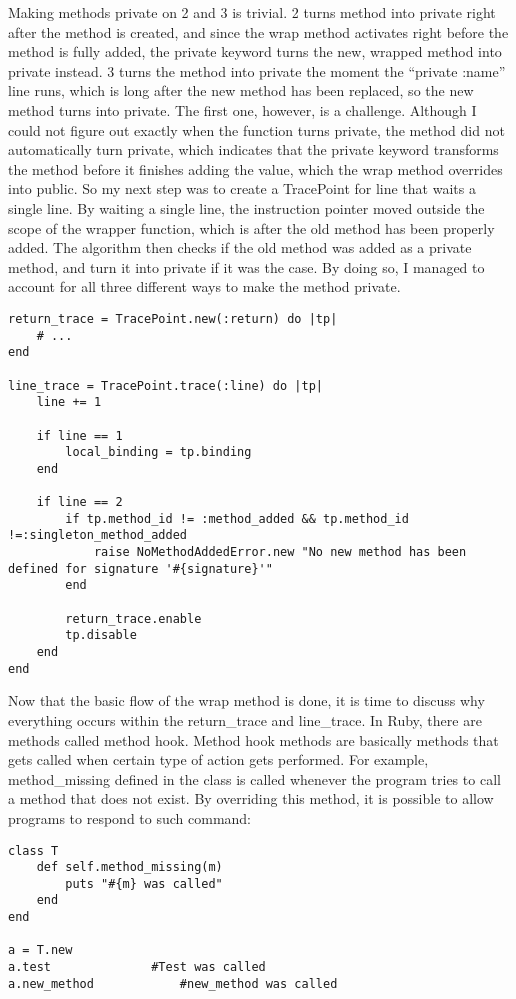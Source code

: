 Making methods private on 2 and 3 is trivial.  2 turns method into private right after the method is created, and since the wrap method activates right before the method is fully added, the private keyword turns the new, wrapped method into private instead.  3 turns the method into private the moment the ``private :name'' line runs, which is long after the new method has been replaced, so the new method turns into private.  The first one, however, is a challenge.  Although I could not figure out exactly when the function turns private, the method did not automatically turn private, which indicates that the private keyword transforms the method before it finishes adding the value, which the wrap method overrides into public.  So my next step was to create a TracePoint for line that waits a single line.  By waiting a single line, the instruction pointer moved outside the scope of the wrapper function, which is after the old method has been properly added.  The algorithm then checks if the old method was added as a private method, and turn it into private if it was the case.  By doing so, I managed to account for all three different ways to make the method private.

\begin{lstlisting}[caption={The other TracePoints}]
return_trace = TracePoint.new(:return) do |tp|
    # ...
end

line_trace = TracePoint.trace(:line) do |tp|
    line += 1

    if line == 1
        local_binding = tp.binding
    end

    if line == 2
        if tp.method_id != :method_added && tp.method_id !=:singleton_method_added
            raise NoMethodAddedError.new "No new method has been defined for signature '#{signature}'"
        end

        return_trace.enable
        tp.disable
    end
end
\end{lstlisting}

Now that the basic flow of the wrap method is done, it is time to discuss why everything occurs within the return\_trace and line\_trace.  In Ruby, there are methods called method hook.  Method hook methods are basically methods that gets called when certain type of action gets performed.  For example, method\_missing defined in the class is called whenever the program tries to call a method that does not exist.  By overriding this method, it is possible to allow programs to respond to such command:

\begin{lstlisting}[caption={method\_missing example}]
class T
    def self.method_missing(m)
    	puts "#{m} was called"
    end
end

a = T.new
a.test				#Test was called
a.new_method			#new_method was called
\end{lstlisting}

